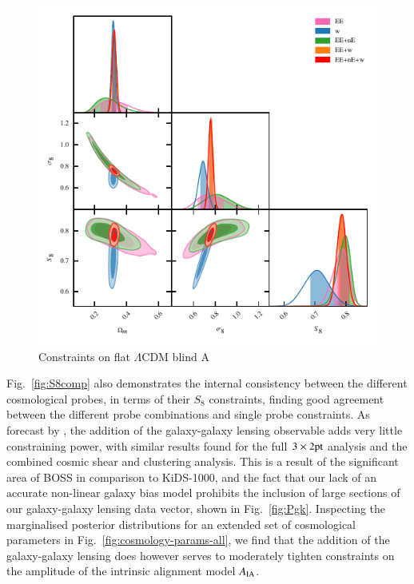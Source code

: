 \begin{figure}
	\begin{center}
		\includegraphics[width=\columnwidth]{Parameter_Plots/omegam_sigma8_s8_blind_A}
		\caption{Constraints on flat $\Lambda$CDM blind A}
		\label{fig:cosmology-params}
	\end{center}
\end{figure}

Fig.~\ref{fig:S8comp} also demonstrates the internal consistency between the different cosmological probes, in terms of their $S_8$ constraints, finding good agreement between the different probe combinations and single probe constraints.  As forecast by \citet{joachimi/etal:inprep}, the addition of the galaxy-galaxy lensing observable adds very little constraining power, with similar results found for the full $3\times2{\rm pt}$ analysis and the combined cosmic shear and clustering analysis.   This is a result of the significant area of BOSS in comparison to KiDS-1000, and the fact that our lack of an accurate non-linear galaxy bias model prohibits the inclusion of large sections of our galaxy-galaxy lensing data vector, shown in Fig.~\ref{fig:Pgk}.   Inspecting the marginalised posterior distributions for an extended set of cosmological parameters in Fig.~\ref{fig:cosmology-params-all}, we find that the addition of the galaxy-galaxy lensing does however serves to moderately tighten constraints on the amplitude of the intrinsic alignment model $A_{\rm IA}$.   

